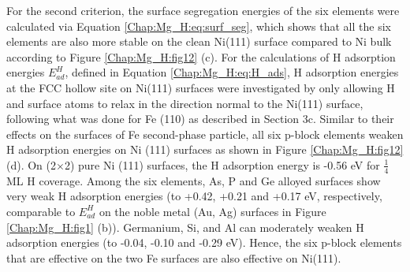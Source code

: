 For the second criterion, the surface segregation energies of the six elements were calculated via Equation \ref{Chap:Mg_H:eq:surf_seg}, which shows that all the six elements are also more stable on the clean Ni(111) surface compared to Ni bulk according to Figure \ref{Chap:Mg_H:fig12} (c). For the calculations of H adsorption energies $E_{ad}^H$, defined in Equation \ref{Chap:Mg_H:eq:H_ads}, H adsorption energies at the FCC hollow site on Ni(111) surfaces were investigated by only allowing H and surface atoms to relax in the direction normal to the Ni(111) surface, following what was done for Fe (110) as described in Section 3c. Similar to their effects on the surfaces of Fe second-phase particle, all six p-block elements weaken H adsorption energies on Ni (111) surfaces as shown in Figure \ref{Chap:Mg_H:fig12} (d). On (2$\times$2) pure Ni (111) surfaces, the H adsorption energy is -0.56 eV for $\frac{1}{4}$ ML H coverage. Among the six elements, As, P and Ge alloyed surfaces show very weak H adsorption energies (to +0.42, +0.21 and +0.17 eV, respectively, comparable to $E_{ad}^H$ on the noble metal (Au, Ag) surfaces in Figure \ref{Chap:Mg_H:fig1} (b)). Germanium, Si, and Al can moderately weaken H adsorption energies (to -0.04, -0.10 and -0.29 eV). Hence, the six p-block elements that are effective on the two Fe surfaces are also effective on Ni(111).
